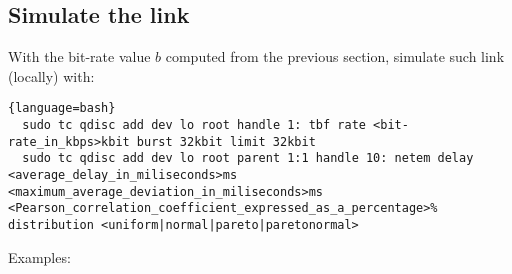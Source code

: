 \subsection{Simulate the link}

With the bit-rate value $b$ computed from the previous section, simulate
such link (locally) with:

\begin{lstlisting}{language=bash}
  sudo tc qdisc add dev lo root handle 1: tbf rate <bit-rate_in_kbps>kbit burst 32kbit limit 32kbit
  sudo tc qdisc add dev lo root parent 1:1 handle 10: netem delay <average_delay_in_miliseconds>ms <maximum_average_deviation_in_miliseconds>ms <Pearson_correlation_coefficient_expressed_as_a_percentage>% distribution <uniform|normal|pareto|paretonormal>
\end{lstlisting}

Examples:

